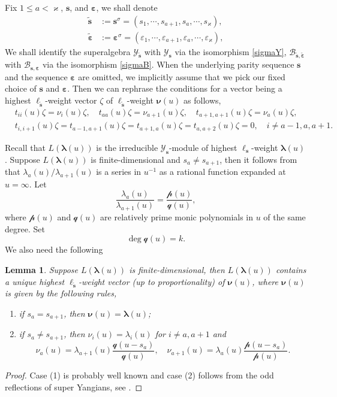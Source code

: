\documentclass[11pt,reqno]{amsart}
\numberwithin{equation}{section}
\newtheorem{lem}[thm]{Lemma}
\theoremstyle{definition}
\theoremstyle{remark}
\newcommand{\beq}{\begin{equation}}
\newcommand{\eeq}{\end{equation}}
\newcommand{\mc}{\mathcal}
\newcommand{\tl}{\tilde}
\newcommand{\lle}{\leqslant}
\newcommand{\la}{\lambda}
\newcommand{\bla}{\bm\lambda}
\newcommand{\YMN}{{\mathscr{Y}_{\bm s}}}
\newcommand{\YMNtl}{{\mathscr{Y}_{\tl{\bm s}}}}
\newcommand{\BMN}{{\mathscr{B}_{\bm s,\bm \ve}}}
\newcommand{\BMNtl}{{\mathscr{B}_{\tl{\bm s},\tl{\bm \ve}}}}
\newcommand{\ka}{\varkappa}
\newcommand{\ve}{\varepsilon}
\newcommand{\s}{{\bm s}}
\begin{document}
Fix $1\lle a<\ka$, $\s$, and $\bm\ve$, we shall denote
\begin{align*}
\tl{\bm s}&:=\s^{\sigma}=(s_1,\cdots,s_{a+1},s_a,\cdots,s_\ka), \\
\tl{\bm \ve}&:=\bm\ve^{\sigma}=(\ve_1,\cdots,\ve_{a+1},\ve_a,\cdots,\ve_\ka),
\end{align*}
We shall identify the superalgebra $\YMNtl$ with $\YMN$ via the isomorphism \eqref{sigmaY}, $\BMNtl$ with $\BMN$ via the isomorphism \eqref{sigmaB}. When the underlying parity sequence $\s$ and the sequence $\bm\ve$ are omitted, we implicitly assume that we pick our fixed choice of $\s$ and $\bm\ve$. Then we can rephrase the conditions for a vector being a highest $\ell_{\tl{\s}}$-weight vector $\zeta$ of  $\ell_{\tl{\s}}$-weight $\bm\nu(u)$ as follows,
\beq\label{simpleref}
\begin{split}
&t_{ii}(u)\zeta=\nu_i(u)\zeta,\quad t_{aa}(u)\zeta=\nu_{a+1}(u)\zeta,\quad t_{a+1,a+1}(u)\zeta=\nu_a(u)\zeta,\\
&t_{i,i+1}(u)\zeta=t_{a-1,a+1}(u)\zeta=t_{a+1,a}(u)\zeta=t_{a,a+2}(u)\zeta=0,\quad i\ne a-1,a,a+1.
\end{split}
\eeq

Recall that $L(\bla(u))$ is the irreducible $\YMN$-module of highest $\ell_\s$-weight $\bla(u)$. Suppose $L(\bla(u))$ is finite-dimensional and $s_a\ne s_{a+1}$, then it follows from \cite{Zhang1995reps} that $\la_a(u)/\la_{a+1}(u)$ is a series in $u^{-1}$ as a rational function expanded at $u=\infty$. Let
\beq\label{pqdef}
\frac{\la_a(u)}{\la_{a+1}(u)}=\frac{\mc p(u)}{\mc q(u)},
\eeq
where $\mc p(u)$ and $\mc q(u)$ are relatively prime monic polynomials in $u$ of the same degree. Set
\beq\label{mcqdeg}
\deg \mc q(u)= k.
\eeq
We also need the following
\begin{lem}\label{lem:ell-weight-ref}
Suppose $L(\bla(u))$ is finite-dimensional, then $L(\bla(u))$ contains a unique highest $\ell_{\tl\s}$-weight vector (up to proportionality) of $\bm\nu(u)$, where $\bm\nu(u)$ is given by the following rules,
\begin{enumerate}
    \item if $s_a=s_{a+1}$, then $\bm\nu(u)=\bla(u)$;
    \item if $s_a\ne s_{a+1}$, then  $\nu_i(u)=\la_i(u)$ for $i\ne a,a+1$ and
    \[
    \nu_a(u)=\la_{a+1}(u)\frac{\mc q(u-s_a)}{\mc q(u)},\quad \nu_{a+1}(u)=\la_{a}(u)\frac{\mc p(u-s_a)}{\mc p(u)}.
    \]
\end{enumerate}
\end{lem}
\begin{proof}
Case (1) is probably well known and case (2) follows from the odd reflections of super Yangians, see \cite{Molev2022odd,Lu2022note}.
\end{proof}
\end{document}
